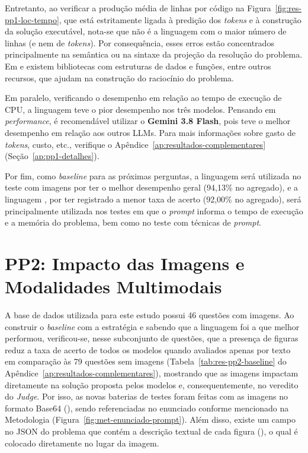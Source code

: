 Entretanto, ao verificar a produção média de linhas por código na Figura~\ref{fig:res-pp1-loc-tempo}, que está estritamente ligada à predição dos \textit{tokens} e à construção da solução executável, nota-se que  não é a linguagem com o maior número de linhas (e nem de \textit{tokens}). Por consequência, esses erros estão concentrados principalmente na semântica ou na sintaxe da projeção da resolução do problema. Em  e  existem bibliotecas com estruturas de dados e funções, entre outros recursos, que ajudam na construção do raciocínio do problema.

Em paralelo, verificando o desempenho em relação ao tempo de execução de CPU, a linguagem  teve o pior desempenho nos três modelos. Pensando em \textit{performance}, é recomendável utilizar o \textbf{Gemini 3.8 Flash}, pois teve o melhor desempenho em relação aos outros LLMs. Para mais informações sobre gasto de \textit{tokens}, custo, etc., verifique o Apêndice~\ref{ap:resultados-complementares} (Seção~\ref{ap:pp1-detalhes}).

Por fim, como \textit{baseline} para as próximas perguntas, a linguagem  será utilizada no teste com imagens por ter o melhor desempenho geral (94,13\% no agregado), e a linguagem , por ter registrado a menor taxa de acerto (92,00\% no agregado), será principalmente utilizada nos testes em que o \textit{prompt} informa o tempo de execução e a memória do problema, bem como no teste com técnicas de \textit{prompt}.


\section{PP2: Impacto das Imagens e Modalidades Multimodais}\label{sec:res-rq2}

A base de dados utilizada para este estudo possui 46 questões com imagens. Ao construir o \textit{baseline} com a estratégia  e sabendo que a linguagem  foi a que melhor performou, verificou-se, nesse subconjunto de questões, que a presença de figuras reduz a taxa de acerto de todos os modelos quando avaliados apenas por texto em comparação às 79 questões sem imagens (Tabela~\ref{tab:res-pp2-baseline} do Apêndice~\ref{ap:resultados-complementares}), mostrando que as imagens impactam diretamente na solução proposta pelos modelos e, consequentemente, no veredito do \textit{Judge}. Por isso, as novas baterias de testes foram feitas com as imagens no formato Base64 (), sendo referenciadas no enunciado conforme mencionado na Metodologia (Figura~\ref{fig:met-enunciado-prompt}). Além disso, existe um campo no JSON do problema que contém a descrição textual de cada figura (), o qual é colocado diretamente no lugar da imagem.

